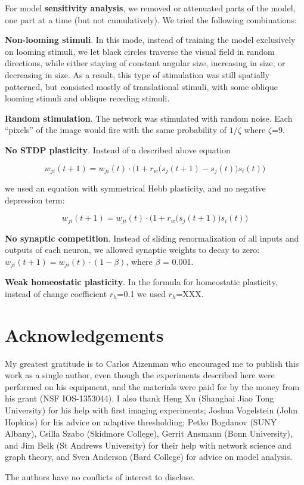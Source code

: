 \documentclass{article}
\begin{document}
For model \textbf{sensitivity analysis}, we removed or attenuated parts of the model, one part at a time (but not cumulatively). We tried the following combinations:

\textbf{Non-looming stimuli}. In this mode, instead of training the model exclusively on looming stimuli, we let black circles traverse the visual field in random directions, while either staying of constant angular size, increasing in size, or decreasing in size. As a result, this type of stimulation was still spatially patterned, but consisted mostly of translational stimuli, with some oblique looming stimuli and oblique receding stimuli.

\textbf{Random stimulation}. The network was stimulated with random noise. Each “pixels” of the image would fire with the same probability of $1/\zeta$ where $\zeta$=9.

\textbf{No STDP plasticity}. Instead of a described above equation 

\[ w_{ji}(t+1) = w_{ji}(t)\cdot\Big(1+r_w\big(s_j(t+1)-s_j(t)\big)s_i(t)\Big) \]

we used an equation with symmetrical Hebb plasticity, and no negative depression term: 

\[ w_{ji}(t+1) = w_{ji}(t)\cdot\Big(1+r_w\big(s_j(t+1)\big)s_i(t)\Big) \]

\textbf{No synaptic competition}. Instead of sliding renormalization of all inputs and outputs of each neuron, we allowed synaptic weights to decay to zero: $w_{ji}(t+1) = w_{ji}(t)\cdot (1-\beta)$, where $\beta$ = 0.001.

\textbf{Weak homeostatic plasticity}. In the formula for homeostatic plasticity, instead of change coefficient $r_h$=0.1 we used $r_h$=XXX.

\section*{Acknowledgements}

My greatest gratitude is to Carlos Aizenman who encouraged me to publish this work as a single author, even though the experiments described here were performed on his equipment, and the materials were paid for by the money from his grant (NSF IOS-1353044). I also thank Heng Xu (Shanghai Jiao Tong University) for his help with first imaging experiments; Joshua Vogelstein (John Hopkins) for his advice on adaptive thresholding; Petko Bogdanov (SUNY Albany), Csilla Szabo (Skidmore College), Gerrit Ansmann (Bonn University), and Jim Belk (St Andrews University) for their help with network science and graph theory, and Sven Anderson (Bard College) for advice on model analysis.


The authors have no conflicts of interest to disclose.

\nolinenumbers


\end{document}
